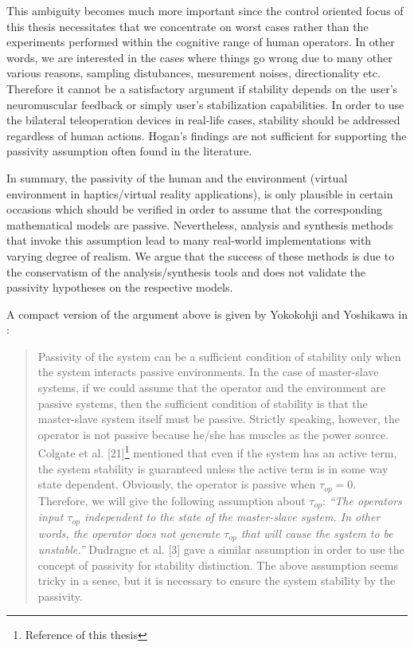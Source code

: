 This ambiguity becomes much more important since the control oriented focus of this thesis necessitates that we concentrate on
worst cases rather than the experiments performed within the cognitive range of human operators. In other words, we are interested in
the cases where things go wrong due to many other various reasons, sampling distubances, mesurement noises, directionality etc. Therefore
it cannot be a satisfactory argument if stability depends on the user's neuromuscular feedback or simply user's stabilization capabilities. 
In order to use the bilateral teleoperation devices in real-life cases, stability should be addressed regardless of human actions. Hogan's 
findings are not sufficient for supporting the passivity assumption often found in the literature. 


In summary, the passivity of the human and the environment (virtual environment in haptics/virtual reality applications), is 
only plausible in certain occasions which should be verified in order to assume that the corresponding mathematical models 
are passive. Nevertheless, analysis and synthesis methods that invoke this assumption lead to many real-world implementations 
with varying degree of realism. We argue that the success of these methods is due to the conservatism of the analysis/synthesis tools
and does not validate the passivity hypotheses on the respective models.

A compact version of the argument above is given by Yokokohji and Yoshikawa in \cite{yokokohjiyoshikawa}: 
\begin{quote}
Passivity of the system can be a
sufficient condition of stability only when the system interacts
passive environments. In the case of master-slave systems, if
we could assume that the operator and the environment are
passive systems, then the sufficient condition of stability is
that the master-slave system itself must be passive. Strictly
speaking, however, the operator is not passive because he/she
has muscles as the power source. Colgate et al. [21]\footnote{Reference 
\cite{colgatehogan88} of this thesis} mentioned
that even if the system has an active term, the system stability
is guaranteed unless the active term is in some way state dependent.
Obviously, the operator is passive when $\tau_{op}= 0$.
Therefore, we will give the following assumption about $\tau_{op}$:
\emph{``The operators input $\tau_{op}$ independent to the state of the
master-slave system. In other words, the operator does not
generate $\tau_{op}$ that will cause the system to be unstable.''}
Dudragne et al. [3] gave a similar assumption in order to use
the concept of passivity for stability distinction. The above
assumption seems tricky in a sense, but it is necessary to ensure
the system stability by the passivity.
\end{quote}

